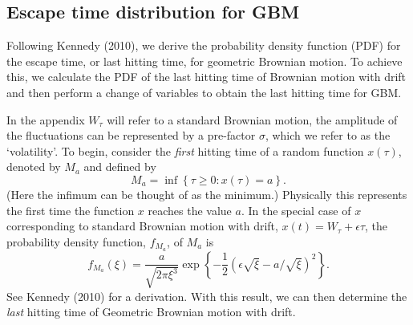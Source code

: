 \documentclass[useAMS]{mn2e}
\begin{document}
\begin{appendix}

\section{Escape time distribution for GBM}\label{Ap::B}

Following Kennedy (2010), we derive the probability density function (PDF) for the escape
time, or last
hitting time, for geometric Brownian motion. To achieve this, we
calculate the PDF of the last hitting time of Brownian motion
with drift and then perform a change of variables to obtain the last
hitting time for GBM.  

In the appendix
$W_{\tau}$ will refer to a standard Brownian motion, 
the amplitude of the fluctuations can be represented by a pre-factor
$\sigma$,
which we refer to as the `volatility'.
To begin, consider the
\emph{first} hitting time of a random function $x(\tau)$,
denoted by $M_a$ and defined by
\begin{equation}
M_{a}=\inf\left\{\tau\geq 0:x(\tau)=a\right\}.
\end{equation}
(Here the infimum can be thought of as the minimum.) Physically this
represents the first time the function $x$ reaches the value
$a$. In the special case of $x$ corresponding to
 standard Brownian motion with drift, $x(t)=W_{\tau}+\epsilon \tau$,
the probability density function, $f_{M_a}$, of $M_a$ is
\begin{equation}
f_{M_{a}}(\xi)=\frac{a}{\sqrt{2\pi \xi^{3}}}\exp\left\{-\frac{1}{2}\left(\epsilon \sqrt{\xi}-a/\sqrt{\xi}\right)^{2}  \right\}.
\label{eqn:BMwDPDF}
\end{equation}
See Kennedy (2010) for a derivation. 
With this result, we can then determine the \emph{last} 
hitting time of Geometric Brownian motion with drift. 


\end{appendix}
\end{document}
